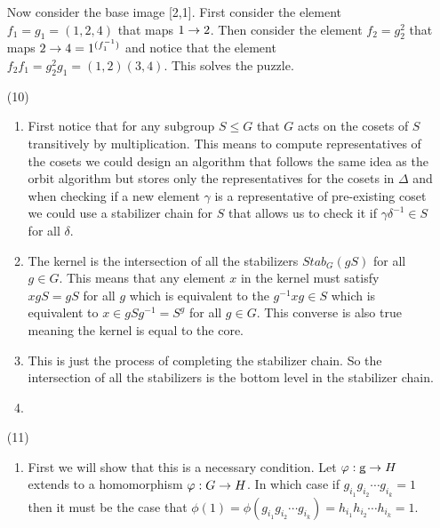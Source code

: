 \documentclass[12pt]{amsart}
\begin{document}
\begin{itemize}
      Now consider the base image [2,1]. First consider the element $f_1=g_1=(1,2,4)$ 
      that maps $1\rightarrow 2$.
      Then consider the element $f_2=g_2^2$ that maps $2\rightarrow 4=1^{(f_1^{-1})}$ and notice that the element
      $f_2f_1=g_2^2g_1=(1,2)(3,4)$. This solves the puzzle.


   \item[(10)]
   \begin{enumerate}[label= (\alph*)]
      \item First notice that for any subgroup $S\leq G$ that $G$ acts on the cosets of $S$ 
      transitively by multiplication. This means to compute representatives of the cosets
      we could design an algorithm that follows the same idea as the orbit algorithm but 
      stores only the representatives for the cosets in $\Delta$ and when checking if a new element $\gamma$
      is a representative of pre-existing coset we could use a stabilizer chain for $S$ 
      that allows us to check it if $\gamma \delta^{-1}\in S$ for all $\delta$.

      \item The kernel is the intersection of all the stabilizers $Stab_G(gS)$ for all $g\in G$. This
           means that any element $x$ in the kernel must satisfy $xgS=gS$ for all $g$ which is equivalent
           to the $g^{-1}xg\in S$ which is equivalent to $x\in gSg^{-1}=S^g$ for all $g\in G$. This converse is also true
           meaning the kernel is equal to the core.

      \item This is just the process of completing the stabilizer chain. So the intersection of all the 
      stabilizers is the bottom level in the stabilizer chain.

      \item
   \end{enumerate}

   \item[(11)]
   \begin{enumerate}
      \item First we will show that this is a necessary condition. 
      Let $\varphi:\underbar{g}\rightarrow H$ extends to a homomorphism $\varphi:G\rightarrow H$. 
      In which case if $g_{i_1}g_{i_2}\cdots g_{i_k}=1$ then it must be 
      the case that $\phi(1)=\phi(g_{i_1}g_{i_2}\cdots g_{i_k})=h_{i_1}h_{i_2}\cdots h_{i_k}=1$.


\end{enumerate}
\end{itemize}
\end{document}
